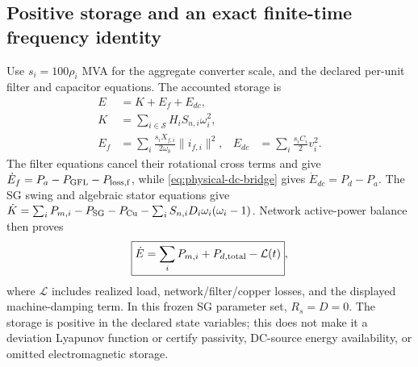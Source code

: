\subsection{Positive storage and an exact finite-time frequency identity}
Use $s_i=100\rho_i$ MVA for the aggregate converter scale, and the declared
per-unit filter and capacitor equations. The accounted storage is
\begin{align}
 E&=K+E_f+E_{dc},\nonumber\\
 K&=\sum_{i\in\mathcal S}H_iS_{n,i}\omega_i^2,\nonumber\\
 E_f&=\sum_i\frac{s_iX_{f,i}}{2\omega_b}\|i_{f,i}\|^2,
 &E_{dc}&=\sum_i\frac{s_iC_i}{2}v_i^2.
 \label{eq:bridge-storage}
\end{align}
The filter equations cancel their rotational cross terms and give
$\dot E_f=P_a-P_{\rm GFL}-P_{\rm loss,f}$, while
\eqref{eq:physical-dc-bridge} gives $\dot E_{dc}=P_d-P_a$.
The SG swing and algebraic stator equations give
$\dot K=\sum_i P_{m,i}-P_{\rm SG}-P_{\rm Cu}
-\sum_iS_{n,i}D_i\omega_i(\omega_i-1)$.
Network active-power balance then proves
\begin{equation}
 \boxed{\dot E=\sum_iP_{m,i}+P_{d,\rm total}-\mathcal L(t)},
 \label{eq:bridge-energy}
\end{equation}
where $\mathcal L$ includes realized load, network/filter/copper losses,
and the displayed machine-damping term. In this frozen SG parameter set,
$R_s=D=0$. The storage is positive in the declared state variables; this
does not make it a deviation Lyapunov function or certify passivity, DC-source
energy availability, or omitted electromagnetic storage.

